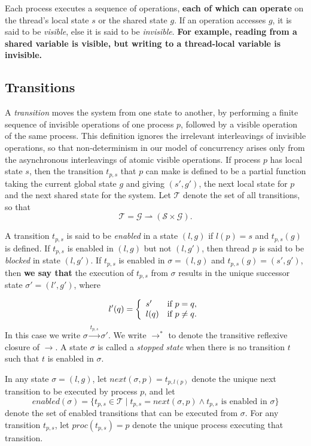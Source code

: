 \documentclass[12pt,a4paper,twoside,openright]{report}
\begin{document}
Each process executes a sequence of operations, \textbf{each of which can
operate }on the thread's local state $s$ or the shared
state $g$. If an operation
accesses $g$, it is said to be \emph{visible}, else it is said to be
\emph{invisible}. \textbf{For example, reading from a shared variable is
visible, but writing to a thread-local variable is invisible.}

\subsection{Transitions}
\label{sec:trans-prep}
A \emph{transition} moves the system from one state to another,
by performing a finite sequence of invisible operations of one
process $p$, followed by a visible operation of the same
process. This definition ignores the irrelevant
interleavings of invisible operations, so that
non-determinism in our model of concurrency
arises only from the asynchronous interleavings of
atomic visible operations.
If process $p$ has local state $s$, then the transition $t_{p,s}$
that $p$ can make is defined to be a partial function taking the current
global state $g$ and giving $(s', g')$, the next local state for $p$
and the next shared state for the system. Let $\mathcal{T}$ denote the
set of all transitions, so that
	\[\mathcal{T} = \mathcal{G} \rightharpoonup
				(\mathcal{S} \times \mathcal{G}).\]

A transition $t_{p,s}$ is said to be \emph{enabled} in a state
$(l, g)$ if $l(p) = s$ and $t_{p,s}(g)$ is defined.
If $t_{p,s}$ is enabled in $(l, g)$ but not $(l, g')$,
then thread $p$ is said to be \emph{blocked} in
state $(l, g')$.
If $t_{p,s}$ is enabled in $\sigma = (l, g)$ and 
$t_{p,s}(g) = (s', g')$, then \textbf{we say that }the
execution of $t_{p,s}$ from $\sigma$ results in the unique successor
state $\sigma' = (l', g')$, where

\[
	l'(q) = \left\{\begin{array}{lr}
				s' & \textmd{if } p = q, \\
				l(q) &\textmd{if } p \neq q.
			\end{array} \right.
\]
In this case we write $\sigma \xrightarrow{t_{p,s}} \sigma'$.
We write $\longrightarrow^*$ to denote the transitive reflexive
closure of $\longrightarrow$.
A state $\sigma$ is called a \emph{stopped state} when there is no transition
$t$ such that $t$ is enabled in $\sigma$.

In any state $\sigma = (l, g)$, let
$\textit{next}(\sigma, p) = t_{p,l(p)}$ denote the unique next transition
to be executed by process $p$, and let
\[
	\textit{enabled}(\sigma) = \{t_{p,s} \in \mathcal{T} \mid
	t_{p,s} = \textit{next}(\sigma, p)
	\wedge t_{p,s} \text{ is enabled in } \sigma\}
\]
denote the set of enabled transitions that can be executed from $\sigma$.
For any transition $t_{p,s}$, let $\textit{proc}(t_{p,s}) = p$
denote the unique process executing that transition.
\end{document}
